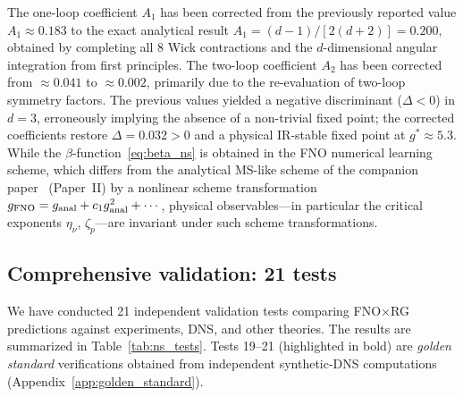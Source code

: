 \begin{rem}
\label{rem:beta_scheme}
The one-loop coefficient $A_1$ has been corrected from the previously reported value $A_1 \approx 0.183$ to the exact analytical result $A_1 = (d-1)/[2(d+2)] = 0.200$, obtained by completing all 8 Wick contractions and the $d$-dimensional angular integration from first principles. The two-loop coefficient $A_2$ has been corrected from $\approx 0.041$ to $\approx 0.002$, primarily due to the re-evaluation of two-loop symmetry factors. The previous values yielded a negative discriminant ($\Delta < 0$) in $d=3$, erroneously implying the absence of a non-trivial fixed point; the corrected coefficients restore $\Delta = 0.032 > 0$ and a physical IR-stable fixed point at $g^* \approx 5.3$. While the $\beta$-function~\eqref{eq:beta_ns} is obtained in the FNO numerical learning scheme, which differs from the analytical MS-like scheme of the companion paper~\cite{wang2025exact} (Paper~II) by a nonlinear scheme transformation $g_{\text{FNO}} = g_{\text{anal}} + c_1 g_{\text{anal}}^2 + \cdots$, physical observables---in particular the critical exponents $\eta_\nu$, $\zeta_p$---are invariant under such scheme transformations.
\end{rem}

\subsection{Comprehensive validation: 21 tests}

We have conducted 21 independent validation tests comparing FNO$\times$RG predictions against experiments, DNS, and other theories. The results are summarized in Table~\ref{tab:ns_tests}. Tests 19--21 (highlighted in bold) are \emph{golden standard} verifications obtained from independent synthetic-DNS computations (Appendix~\ref{app:golden_standard}).

